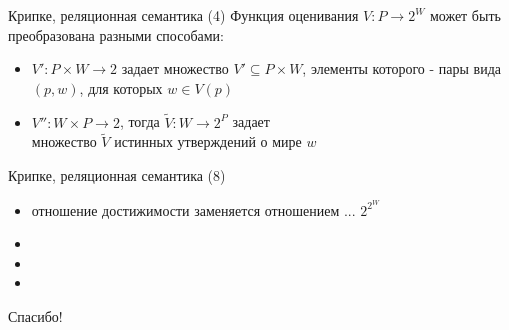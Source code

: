 \documentclass{beamer}
\begin{document}
\begin{frame}{Крипке, реляционная семантика (4)}
Функция оценивания $V: P \to 2^W$ может быть преобразована разными способами:\\
\bigskip
\begin{itemize}
  \item $V': P \times W \to 2$ задает множество $V' \subseteq P \times W$, элементы которого - пары вида $(p, w)$, для которых $w \in V(p)$
  \item $V'': W \times P \to 2$, тогда $\tilde{V} : W \to 2^P$ задает\\ множество $\tilde{V}$ истинных утверждений о мире $w$
\end{itemize}
\end{frame}



\begin{frame}{Крипке, реляционная семантика (8)}
\begin{itemize}
  \item отношение достижимости заменяется отношением ... $2^{2^W}$ 
  \item 
  \item 
  \item 
\end{itemize}
\end{frame}


\begin{frame}{}
    \thispagestyle{empty}
    \begin{center}
        {\large Спасибо!}
    \end{center}
\end{frame}


\end{document}
